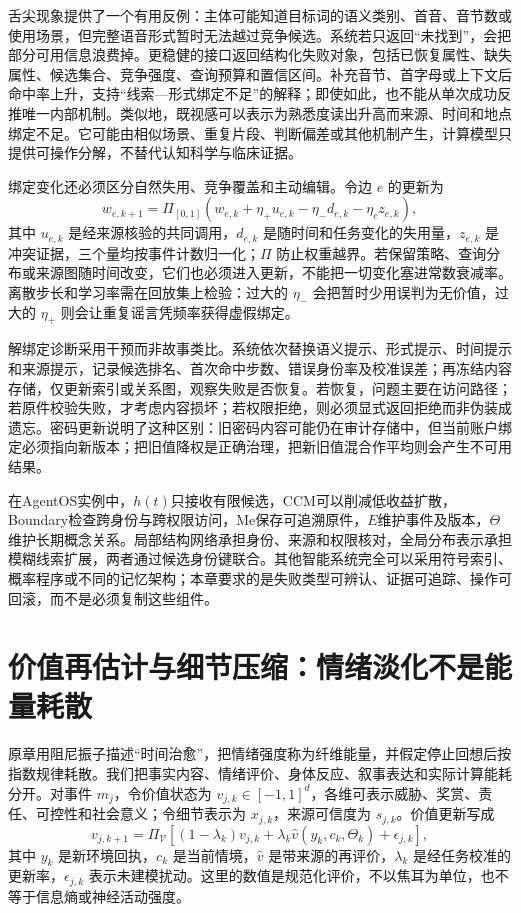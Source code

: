 舌尖现象提供了一个有用反例：主体可能知道目标词的语义类别、首音、音节数或使用场景，但完整语音形式暂时无法越过竞争候选。系统若只返回“未找到”，会把部分可用信息浪费掉。更稳健的接口返回结构化失败对象，包括已恢复属性、缺失属性、候选集合、竞争强度、查询预算和置信区间。补充音节、首字母或上下文后命中率上升，支持“线索—形式绑定不足”的解释；即使如此，也不能从单次成功反推唯一内部机制。类似地，既视感可以表示为熟悉度读出升高而来源、时间和地点绑定不足。它可能由相似场景、重复片段、判断偏差或其他机制产生，计算模型只提供可操作分解，不替代认知科学与临床证据。

绑定变化还必须区分自然失用、竞争覆盖和主动编辑。令边 $e$ 的更新为
\[
w_{e,k+1}=\Pi_{[0,1]}\!\left(w_{e,k}+\eta_+u_{e,k}-\eta_-d_{e,k}-\eta_c z_{e,k}\right),
\]
其中 $u_{e,k}$ 是经来源核验的共同调用，$d_{e,k}$ 是随时间和任务变化的失用量，$z_{e,k}$ 是冲突证据，三个量均按事件计数归一化；$\Pi$ 防止权重越界。若保留策略、查询分布或来源图随时间改变，它们也必须进入更新，不能把一切变化塞进常数衰减率。离散步长和学习率需在回放集上检验：过大的 $\eta_-$ 会把暂时少用误判为无价值，过大的 $\eta_+$ 则会让重复谣言凭频率获得虚假绑定。

解绑定诊断采用干预而非故事类比。系统依次替换语义提示、形式提示、时间提示和来源提示，记录候选排名、首次命中步数、错误身份率及校准误差；再冻结内容存储，仅更新索引或关系图，观察失败是否恢复。若恢复，问题主要在访问路径；若原件校验失败，才考虑内容损坏；若权限拒绝，则必须显式返回拒绝而非伪装成遗忘。密码更新说明了这种区别：旧密码内容可能仍在审计存储中，但当前账户绑定必须指向新版本；把旧值降权是正确治理，把新旧值混合作平均则会产生不可用结果。

在AgentOS实例中，$h(t)$只接收有限候选，CCM可以削减低收益扩散，Boundary检查跨身份与跨权限访问，Me保存可追溯原件，$E$维护事件及版本，$\Theta$维护长期概念关系。局部结构网络承担身份、来源和权限核对，全局分布表示承担模糊线索扩展，两者通过候选身份键联合。其他智能系统完全可以采用符号索引、概率程序或不同的记忆架构；本章要求的是失败类型可辨认、证据可追踪、操作可回滚，而不是必须复制这些组件。

\section{价值再估计与细节压缩：情绪淡化不是能量耗散}
\label{sec:dissipation_phase}
原章用阻尼振子描述“时间治愈”，把情绪强度称为纤维能量，并假定停止回想后按指数规律耗散。我们把事实内容、情绪评价、身体反应、叙事表达和实际计算能耗分开。对事件 $m_j$，令价值状态为 $v_{j,k}\in[-1,1]^d$，各维可表示威胁、奖赏、责任、可控性和社会意义；令细节表示为 $x_{j,k}$，来源可信度为 $s_{j,k}$。价值更新写成
\[
v_{j,k+1}=\Pi_{\mathcal V}\left[(1-\lambda_k)v_{j,k}+\lambda_k\widehat v(y_k,c_k,\Theta_k)+\epsilon_{j,k}\right],
\]
其中 $y_k$ 是新环境回执，$c_k$ 是当前情境，$\widehat v$ 是带来源的再评价，$\lambda_k$ 是经任务校准的更新率，$\epsilon_{j,k}$ 表示未建模扰动。这里的数值是规范化评价，不以焦耳为单位，也不等于信息熵或神经活动强度。

